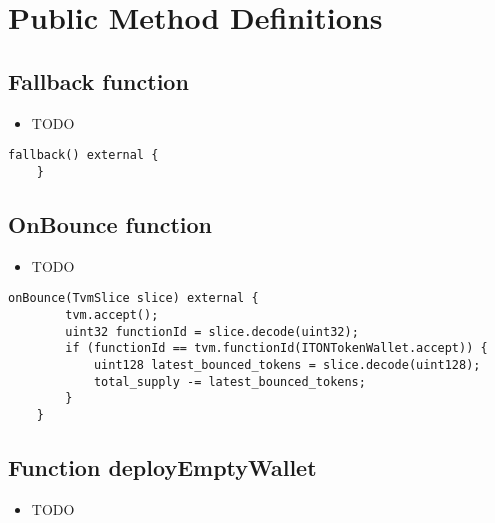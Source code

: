 \section{Public Method Definitions}


\subsection{Fallback function}

\noindent\begin{itemize}
\item TODO
\end{itemize}

\begin{lstlisting}[firstnumber=524]
    fallback() external {
    }
\end{lstlisting}

\subsection{OnBounce function}

\noindent\begin{itemize}
\item TODO
\end{itemize}

\begin{lstlisting}[firstnumber=515]
    onBounce(TvmSlice slice) external {
        tvm.accept();
        uint32 functionId = slice.decode(uint32);
        if (functionId == tvm.functionId(ITONTokenWallet.accept)) {
            uint128 latest_bounced_tokens = slice.decode(uint128);
            total_supply -= latest_bounced_tokens;
        }
    }
\end{lstlisting}

\subsection{Function deployEmptyWallet}

\noindent\begin{itemize}
\item TODO
\end{itemize}

